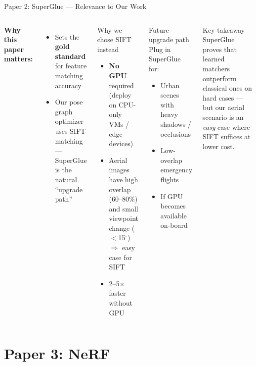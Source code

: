 \documentclass[aspectratio=169, 11pt]{beamer}
\begin{document}
\begin{frame}{Paper 2: SuperGlue --- Relevance to Our Work}
\small
\begin{columns}[T]
\textbf{Why this paper matters:}
\begin{itemize}
    \item Sets the \textbf{gold standard} for feature matching accuracy
    \item Our pose graph optimizer uses SIFT matching --- SuperGlue is the natural ``upgrade path''
\end{itemize}

\vspace{0.3em}
\begin{block}{Why we chose SIFT instead}
\begin{itemize}
    \item \textbf{No GPU} required (deploy on CPU-only VMs / edge devices)
    \item Aerial images have high overlap (60--80\%) and small viewpoint change ($<$15$^\circ$) $\Rightarrow$ easy case for SIFT
    \item 2--5$\times$ faster without GPU
\end{itemize}
\end{block}

\begin{exampleblock}{Future upgrade path}
Plug in SuperGlue for:
\begin{itemize}
    \item Urban scenes with heavy shadows / occlusions
    \item Low-overlap emergency flights
    \item If GPU becomes available on-board
\end{itemize}
\end{exampleblock}

\vspace{0.3em}
\begin{alertblock}{Key takeaway}
SuperGlue proves that learned matchers outperform classical ones on hard cases --- but our aerial scenario is an \textit{easy} case where SIFT suffices at lower cost.
\end{alertblock}
\end{columns}
\end{frame}

\section{Paper 3: NeRF}
\end{document}

